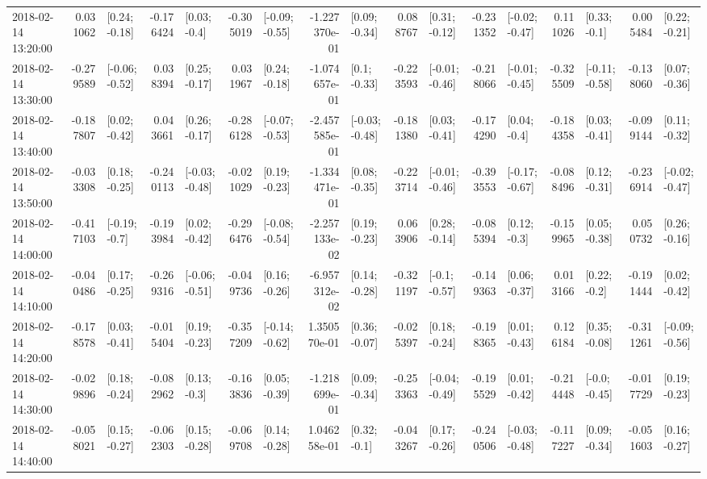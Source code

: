 \begin{tabular}{lrlrlrlrlrlrlrlrl}
2018-02-14 13:20:00 &  0.031062 &   [0.24; -0.18] & -0.176424 &    [0.03; -0.4] & -0.305019 &  [-0.09; -0.55] & -1.227370e-01 &   [0.09; -0.34] &  0.088767 &   [0.31; -0.12] & -0.231352 &  [-0.02; -0.47] &  0.111026 &    [0.33; -0.1] &  0.005484 &   [0.22; -0.21] \\
2018-02-14 13:30:00 & -0.279589 &  [-0.06; -0.52] &  0.038394 &   [0.25; -0.17] &  0.031967 &   [0.24; -0.18] & -1.074657e-01 &    [0.1; -0.33] & -0.223593 &  [-0.01; -0.46] & -0.218066 &  [-0.01; -0.45] & -0.325509 &  [-0.11; -0.58] & -0.138060 &   [0.07; -0.36] \\
2018-02-14 13:40:00 & -0.187807 &   [0.02; -0.42] &  0.043661 &   [0.26; -0.17] & -0.286128 &  [-0.07; -0.53] & -2.457585e-01 &  [-0.03; -0.48] & -0.181380 &   [0.03; -0.41] & -0.174290 &    [0.04; -0.4] & -0.184358 &   [0.03; -0.41] & -0.099144 &   [0.11; -0.32] \\
2018-02-14 13:50:00 & -0.033308 &   [0.18; -0.25] & -0.240113 &  [-0.03; -0.48] & -0.021029 &   [0.19; -0.23] & -1.334471e-01 &   [0.08; -0.35] & -0.223714 &  [-0.01; -0.46] & -0.393553 &  [-0.17; -0.67] & -0.088496 &   [0.12; -0.31] & -0.236914 &  [-0.02; -0.47] \\
2018-02-14 14:00:00 & -0.417103 &   [-0.19; -0.7] & -0.193984 &   [0.02; -0.42] & -0.296476 &  [-0.08; -0.54] & -2.257133e-02 &   [0.19; -0.23] &  0.063906 &   [0.28; -0.14] & -0.085394 &    [0.12; -0.3] & -0.159965 &   [0.05; -0.38] &  0.050732 &   [0.26; -0.16] \\
2018-02-14 14:10:00 & -0.040486 &   [0.17; -0.25] & -0.269316 &  [-0.06; -0.51] & -0.049736 &   [0.16; -0.26] & -6.957312e-02 &   [0.14; -0.28] & -0.321197 &   [-0.1; -0.57] & -0.149363 &   [0.06; -0.37] &  0.013166 &    [0.22; -0.2] & -0.191444 &   [0.02; -0.42] \\
2018-02-14 14:20:00 & -0.178578 &   [0.03; -0.41] & -0.015404 &   [0.19; -0.23] & -0.357209 &  [-0.14; -0.62] &  1.350570e-01 &   [0.36; -0.07] & -0.025397 &   [0.18; -0.24] & -0.198365 &   [0.01; -0.43] &  0.126184 &   [0.35; -0.08] & -0.311261 &  [-0.09; -0.56] \\
2018-02-14 14:30:00 & -0.029896 &   [0.18; -0.24] & -0.082962 &    [0.13; -0.3] & -0.163836 &   [0.05; -0.39] & -1.218699e-01 &   [0.09; -0.34] & -0.253363 &  [-0.04; -0.49] & -0.195529 &   [0.01; -0.42] & -0.214448 &   [-0.0; -0.45] & -0.017729 &   [0.19; -0.23] \\
2018-02-14 14:40:00 & -0.058021 &   [0.15; -0.27] & -0.062303 &   [0.15; -0.28] & -0.069708 &   [0.14; -0.28] &  1.046258e-01 &    [0.32; -0.1] & -0.043267 &   [0.17; -0.26] & -0.240506 &  [-0.03; -0.48] & -0.117227 &   [0.09; -0.34] & -0.051603 &   [0.16; -0.27] \\

\end{tabular}
